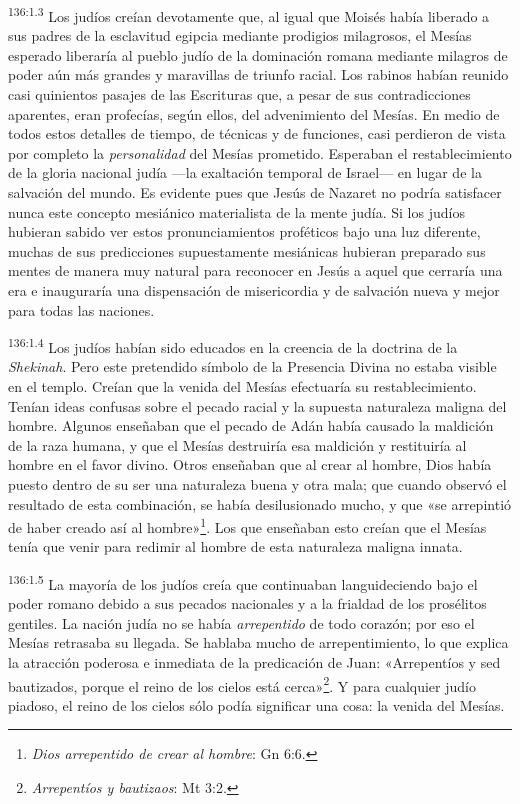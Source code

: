 \par 
\textsuperscript{136:1.3} Los judíos creían devotamente que, al igual que Moisés había liberado a sus padres de la esclavitud egipcia mediante prodigios milagrosos, el Mesías esperado liberaría al pueblo judío de la dominación romana mediante milagros de poder aún más grandes y maravillas de triunfo racial. Los rabinos habían reunido casi quinientos pasajes de las Escrituras que, a pesar de sus contradicciones aparentes, eran profecías, según ellos, del advenimiento del Mesías. En medio de todos estos detalles de tiempo, de técnicas y de funciones, casi perdieron de vista por completo la \textit{personalidad} del Mesías prometido. Esperaban el restablecimiento de la gloria nacional judía ---la exaltación temporal de Israel--- en lugar de la salvación del mundo. Es evidente pues que Jesús de Nazaret no podría satisfacer nunca este concepto mesiánico materialista de la mente judía. Si los judíos hubieran sabido ver estos pronunciamientos proféticos bajo una luz diferente, muchas de sus predicciones supuestamente mesiánicas hubieran preparado sus mentes de manera muy natural para reconocer en Jesús a aquel que cerraría una era e inauguraría una dispensación de misericordia y de salvación nueva y mejor para todas las naciones.

\par 
\textsuperscript{136:1.4} Los judíos habían sido educados en la creencia de la doctrina de la \textit{Shekinah}. Pero este pretendido símbolo de la Presencia Divina no estaba visible en el templo. Creían que la venida del Mesías efectuaría su restablecimiento. Tenían ideas confusas sobre el pecado racial y la supuesta naturaleza maligna del hombre. Algunos enseñaban que el pecado de Adán había causado la maldición de la raza humana, y que el Mesías destruiría esa maldición y restituiría al hombre en el favor divino. Otros enseñaban que al crear al hombre, Dios había puesto dentro de su ser una naturaleza buena y otra mala; que cuando observó el resultado de esta combinación, se había desilusionado mucho, y que «se arrepintió de haber creado así al hombre»\footnote{\textit{Dios arrepentido de crear al hombre}: Gn 6:6.}. Los que enseñaban esto creían que el Mesías tenía que venir para redimir al hombre de esta naturaleza maligna innata.

\par 
\textsuperscript{136:1.5} La mayoría de los judíos creía que continuaban languideciendo bajo el poder romano debido a sus pecados nacionales y a la frialdad de los prosélitos gentiles. La nación judía no se había \textit{arrepentido} de todo corazón; por eso el Mesías retrasaba su llegada. Se hablaba mucho de arrepentimiento, lo que explica la atracción poderosa e inmediata de la predicación de Juan: «Arrepentíos y sed bautizados, porque el reino de los cielos está cerca»\footnote{\textit{Arrepentíos y bautizaos}: Mt 3:2.}. Y para cualquier judío piadoso, el reino de los cielos sólo podía significar una cosa: la venida del Mesías.


